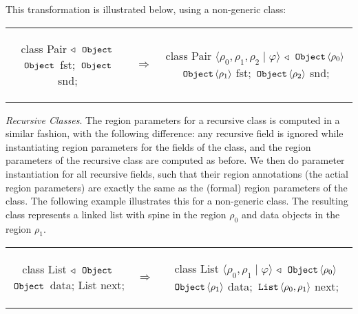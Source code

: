This transformation is illustrated below, using a non-generic  class:

\begin{tabular}{ccc}
\begin{minipage}{0.28\linewidth}
\begin{codejava}
class Pair
  $\triangleleft$ $\,{\tt Object}\,$
{
  $\,{\tt Object}\,$ fst;
  $\,{\tt Object}\,$ snd;
}
\end{codejava}
\end{minipage}
&
$\Rightarrow$
&
\begin{minipage}{0.5\linewidth}
\begin{codejava}
class Pair $\langle \rho_0, \rho_1, \rho_2 \; | \; \varphi \rangle$
  $\triangleleft$ $\,{\tt Object}\, \langle \rho_0 \rangle$
{
  $\,{\tt Object}\, \langle \rho_1 \rangle$ fst;
  $\,{\tt Object}\, \langle \rho_2 \rangle$ snd;
}
\end{codejava}
\end{minipage}
\end{tabular}

\emph{Recursive Classes}.
The region parameters for a recursive class is computed in
a similar fashion, with the following difference: any recursive
field is ignored while instantiating region parameters for the fields of
the class, and the region parameters of the recursive class are computed
as before. We then do parameter instantiation for all recursive fields,
such that their region annotations (the actial region parameters) are
exactly the same as the (formal) region parameters of the class.
The following example illustrates this for a non-generic  class.
The resulting class represents a linked list with spine in the region
$\rho_0$ and data objects in the region $\rho_1$.

\begin{tabular}{ccc}
\begin{minipage}{0.28\linewidth}
\begin{codejava}
class List
  $\triangleleft$ $\,{\tt Object}\,$
{
  $\,{\tt Object}\,$ data;
  List next;
}
\end{codejava}
\end{minipage}
&
$\Rightarrow$
&
\begin{minipage}{0.5\linewidth}
\begin{codejava}
class List $\langle \rho_0, \rho_1 \; | \; \varphi \rangle$
  $\triangleleft$ $\,{\tt Object}\, \langle \rho_0 \rangle$
{
  $\,{\tt Object}\, \langle \rho_1 \rangle$ data;
  $\,{\tt List}\, \langle \rho_0, \rho_1 \rangle$ next;
}
\end{codejava}
\end{minipage}
\end{tabular}

